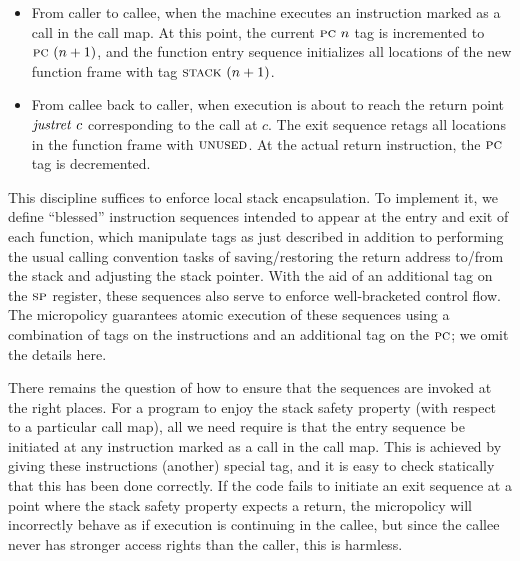 \documentclass[acmsmall,review,anonymous]{acmart}\settopmatter{printfolios=true,printccs=false,printacmref=false}
\begin{document}
{\begin{itemize}

\item From caller to callee, when the machine executes an instruction marked as a call in
  the call map. 
  At this point, the current
  $\textsc{pc} ~ n$ tag is incremented to $\textsc{pc} ~ (n + 1)$, and the function
  entry sequence initializes  all locations of the new function frame with
  tag $\textsc{stack} ~ (n + 1)$.

\item From callee back to caller, when execution is about to reach the return point
  $\mathit{justret}\ c$
  corresponding to the call at $c$.  The exit sequence retags all locations in the function
  frame with $\textsc{unused}$. At the actual return instruction, the
  $\textsc{pc}$ tag is decremented.

\end{itemize}

This discipline suffices to enforce local stack encapsulation.
To implement it,  we define ``blessed'' instruction sequences
intended to appear at the entry and exit of each function,
which manipulate tags as just described in addition to performing the
usual calling convention tasks of saving/restoring the return address to/from
the stack and adjusting the stack pointer. With the aid of an additional tag on
the $\textsc{sp}$ register, these sequences also serve to enforce
well-bracketed control flow.
The micropolicy guarantees atomic execution of these sequences
using a combination of tags on the instructions
and an additional tag on the $\textsc{pc}$; we omit the details here.

There remains the question of how to ensure that the sequences are
invoked at the right places. For a program to enjoy the stack safety property
(with respect to a particular call map), all we need require is that 
the entry sequence be initiated at any instruction marked as a call
in the call map. This is achieved by giving these instructions (another) special tag,
and it is easy to check statically that this has been done correctly.
If the code fails to initiate an exit
sequence at a point where the stack safety property expects a return,
the micropolicy will incorrectly behave as if execution
is continuing in the callee, but since the callee never has stronger access
rights than the caller, this is harmless.

}
\end{document}
